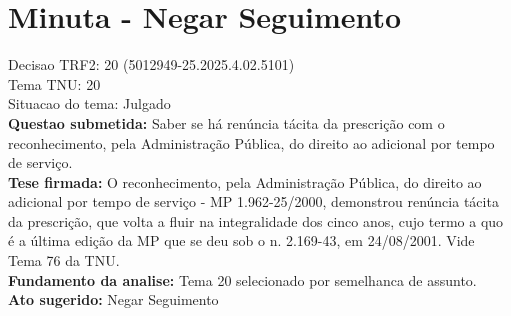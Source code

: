 \documentclass{article}
\begin{document}
\section*{Minuta - Negar Seguimento}
Decisao TRF2: 20 (5012949-25.2025.4.02.5101)\\
Tema TNU: 20\\
Situacao do tema: Julgado\\
\textbf{Questao submetida:} Saber se há renúncia tácita da prescrição com o reconhecimento, pela Administração Pública, do direito ao adicional por tempo de serviço.\\
\textbf{Tese firmada:} O reconhecimento, pela Administração Pública, do direito ao adicional por tempo de serviço - MP 1.962-25/2000, demonstrou renúncia tácita da prescrição, que volta a fluir na integralidade dos cinco anos, cujo termo a quo é a última edição da MP que se deu sob o n. 2.169-43, em 24/08/2001. Vide Tema 76 da TNU.\\
\textbf{Fundamento da analise:} Tema 20 selecionado por semelhanca de assunto.\\
\textbf{Ato sugerido:} Negar Seguimento
\end{document}
